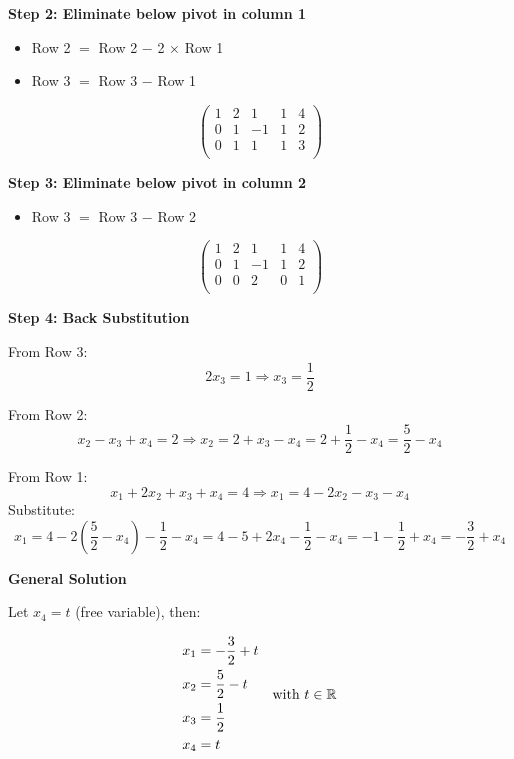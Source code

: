 \textbf{Step 2: Eliminate below pivot in column 1}

\begin{itemize}
	\item Row 2 \(=\) Row 2 \(-\) 2 \(\times\) Row 1
	\item Row 3 \(=\) Row 3 \(-\) Row 1
\end{itemize}

\[
	\begin{pmatrix}
		1 & 2 & 1  & 1 & 4 \\
		0 & 1 & -1 & 1 & 2 \\
		0 & 1 & 1  & 1 & 3 \\
	\end{pmatrix}
\]

\textbf{Step 3: Eliminate below pivot in column 2}

\begin{itemize}
	\item Row 3 \(=\) Row 3 \(-\) Row 2
\end{itemize}

\[
	\begin{pmatrix}
		1 & 2 & 1  & 1 & 4 \\
		0 & 1 & -1 & 1 & 2 \\
		0 & 0 & 2  & 0 & 1 \\
	\end{pmatrix}
\]

\textbf{Step 4: Back Substitution}
\vspace{\baselineskip}

From Row 3:
\[
	2x_3 = 1 \Rightarrow x_3 = \frac{1}{2}
\]

From Row 2:
\[
	x_2 - x_3 + x_4 = 2 \Rightarrow x_2 = 2 + x_3 - x_4 = 2 + \frac{1}{2} - x_4 = \frac{5}{2} - x_4
\]

From Row 1:
\[
	x_1 + 2x_2 + x_3 + x_4 = 4
	\Rightarrow x_1 = 4 - 2x_2 - x_3 - x_4
\]
Substitute:
\[
	x_1 = 4 - 2\left( \frac{5}{2} - x_4 \right) - \frac{1}{2} - x_4
	= 4 - 5 + 2x_4 - \frac{1}{2} - x_4
	= -1 - \frac{1}{2} + x_4 = -\frac{3}{2} + x_4
\]

\textbf{General Solution}
\vspace{\baselineskip}

Let \(x_4 = t\) (free variable), then:

\[
	\begin{aligned}
		x_1 & = -\frac{3}{2} + t \\
		x_2 & = \frac{5}{2} - t  \\
		x_3 & = \frac{1}{2}      \\
		x_4 & = t
	\end{aligned}
	\quad \text{with } t \in \mathbb{R}
\]

